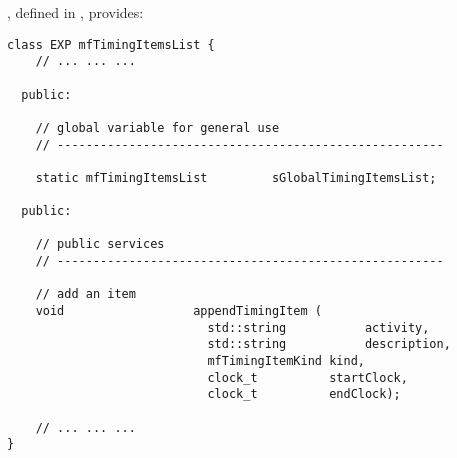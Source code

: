 , defined in , provides:
\begin{lstlisting}[language=CPlusPlus]
class EXP mfTimingItemsList {
	// ... ... ...

  public:

    // global variable for general use
    // ------------------------------------------------------

    static mfTimingItemsList         sGlobalTimingItemsList;

  public:

    // public services
    // ------------------------------------------------------

    // add an item
    void                  appendTimingItem (
                            std::string           activity,
                            std::string           description,
                            mfTimingItemKind kind,
                            clock_t          startClock,
                            clock_t          endClock);

	// ... ... ...
}
\end{lstlisting}

\newpage


